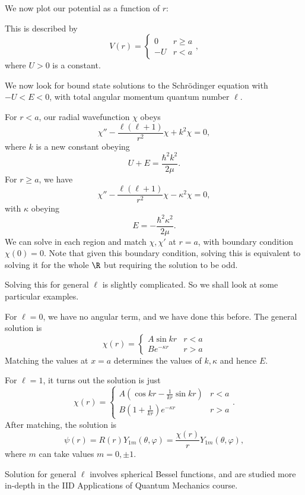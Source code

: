 \documentclass[a4paper]{article}
\begin{document}
\begin{eg}
  We now plot our potential as a function of $r$:
  \begin{center}
  \end{center}
  This is described by
  \[
    V(r) =
    \begin{cases}
      0 & r \geq a\\
      -U & r < a
    \end{cases},
  \]
  where $U > 0$ is a constant.

  We now look for bound state solutions to the Schr\"odinger equation with $-U < E < 0$, with total angular momentum quantum number $\ell$.

  For $r < a$, our radial wavefunction $\chi$ obeys
  \[
    \chi'' - \frac{\ell(\ell + 1)}{r^2} \chi + k^2 \chi = 0,
  \]
  where $k$ is a new constant obeying
  \[
    U + E = \frac{\hbar^2 k^2}{2 \mu}.
  \]
  For $r \geq a$, we have
  \[
    \chi'' - \frac{\ell(\ell + 1)}{r^2} \chi - \kappa^2 \chi = 0,
  \]
  with $\kappa$ obeying
  \[
    E = -\frac{\hbar^2 \kappa^2}{2\mu}.
  \]
  We can solve in each region and match $\chi, \chi'$ at $r = a$, with boundary condition $\chi(0) = 0$. Note that given this boundary condition, solving this is equivalent to solving it for the whole $\R$ but requiring the solution to be odd.

  Solving this for general $\ell$ is slightly complicated. So we shall look at some particular examples.

  For $\ell = 0$, we have no angular term, and we have done this before. The general solution is
  \[
    \chi(r) =
    \begin{cases}
      A \sin k r & r < a\\
      B e^{-\kappa r} & r > a
    \end{cases}
  \]
  Matching the values at $x = a$ determines the values of $k, \kappa$ and hence $E$.

  For $\ell = 1$, it turns out the solution is just
  \[
    \chi(r) =
    \begin{cases}
      A\left(\cos kr - \frac{1}{kr} \sin kr\right) & r < a\\
      B\left(1 + \frac{1}{kr}\right) e^{-\kappa r} & r > a
    \end{cases}.
  \]
  After matching, the solution is
  \[
    \psi(r) = R(r) Y_{1m}(\theta, \varphi) = \frac{\chi (r)}{r} Y_{1m}(\theta, \varphi),
  \]
  where $m$ can take values $m = 0, \pm 1$.

  Solution for general $\ell$ involves spherical Bessel functions, and are studied more in-depth in the IID Applications of Quantum Mechanics course.
\end{eg}
\end{document}
